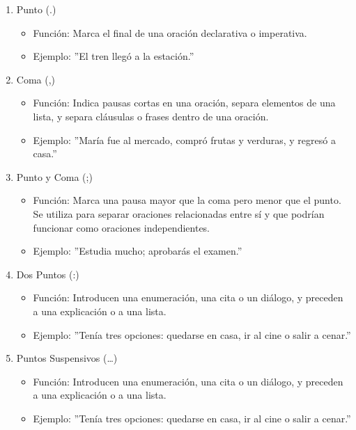 \begin{enumerate}
      \item Punto (.)
            \begin{itemize}
                  \item Función: Marca el final de una oración declarativa o imperativa.
                  \item Ejemplo: ''El tren llegó a la estación.''
            \end{itemize}
      \item Coma (,)
            \begin{itemize}
                  \item Función: Indica pausas cortas en una oración, separa elementos de una lista, y separa cláusulas o frases dentro de una oración.
                  \item Ejemplo: ''María fue al mercado, compró frutas y verduras, y regresó a casa.''
            \end{itemize}
      \item Punto y Coma (;)
            \begin{itemize}
                  \item Función: Marca una pausa mayor que la coma pero menor que el punto. Se utiliza para separar oraciones relacionadas entre sí y que podrían funcionar como oraciones independientes.
                  \item Ejemplo: ''Estudia mucho; aprobarás el examen.''
            \end{itemize}
      \item Dos Puntos (:)
            \begin{itemize}
                  \item Función: Introducen una enumeración, una cita o un diálogo, y preceden a una explicación o a una lista.
                  \item  Ejemplo: ''Tenía tres opciones: quedarse en casa, ir al cine o salir a cenar.''
            \end{itemize}
      \item Puntos Suspensivos (…)
            \begin{itemize}
                  \item Función: Introducen una enumeración, una cita o un diálogo, y preceden a una explicación o a una lista.
                  \item Ejemplo: ''Tenía tres opciones: quedarse en casa, ir al cine o salir a cenar.''
            \end{itemize}

\end{enumerate}
